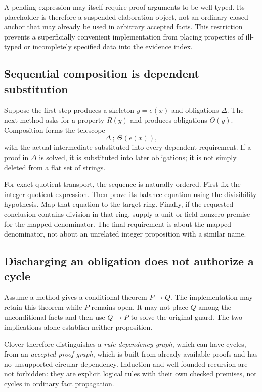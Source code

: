 \documentclass[11pt,a4paper]{article}
\theoremstyle{definition}
\theoremstyle{remark}
\begin{document}
A pending expression may itself require proof arguments to be well typed.
Its placeholder is therefore a suspended elaboration object, not an ordinary
closed anchor that may already be used in arbitrary accepted facts. This
restriction prevents a superficially convenient implementation from placing
properties of ill-typed or incompletely specified data into the evidence index.

\subsection{Sequential composition is dependent substitution}

Suppose the first step produces a skeleton $y=e(x)$ and obligations $\Delta$.
The next method asks for a property $R(y)$ and produces obligations $\Theta(y)$.
Composition forms the telescope
\[
 \Delta\ ;\ \Theta(e(x)),
\]
with the actual intermediate substituted into every dependent requirement.
If a proof in $\Delta$ is solved, it is substituted into later obligations;
it is not simply deleted from a flat set of strings.

For exact quotient transport, the sequence is naturally ordered. First fix
the integer quotient expression. Then prove its balance equation using the
divisibility hypothesis. Map that equation to the target ring. Finally, if
the requested conclusion contains division in that ring, supply a unit or
field-nonzero premise for the mapped denominator. The final requirement is
about the mapped denominator, not about an unrelated integer proposition with
a similar name.

\subsection{Discharging an obligation does not authorize a cycle}

Assume a method gives a conditional theorem $P\to Q$. The implementation may
retain this theorem while $P$ remains open. It may not place $Q$ among the
unconditional facts and then use $Q\to P$ to solve the original guard. The two
implications alone establish neither proposition.

Clover therefore distinguishes a \emph{rule dependency graph}, which can have
cycles, from an \emph{accepted proof graph}, which is built from already
available proofs and has no unsupported circular dependency. Induction and
well-founded recursion are not forbidden: they are explicit logical rules
with their own checked premises, not cycles in ordinary fact propagation.
\end{document}

